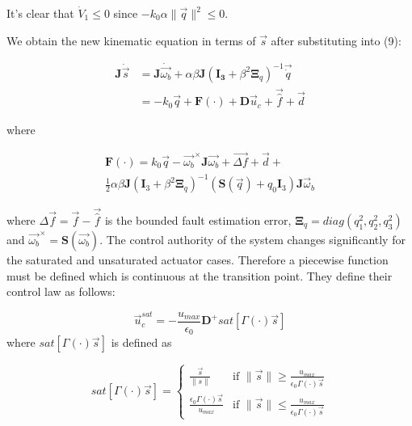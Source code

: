 It's clear that $\dot{V}_{1}\leq0$ since $-k_{0}\alpha \lVert \vec{q} \rVert^{2}\leq0$.


We obtain the new kinematic equation in terms of $\vec{s}$ after substituting into (9):

\begin{equation}
    \begin{split}
        \mathbf{J}\dot{\vec{s}}&=
        \mathbf{J}\dot{\vec{\omega_b}} + \alpha\beta\mathbf{J}(\mathbf{I_3}+\beta^2\mathbf{\Xi}_q)^{-1}\vec{\dot{q}}\\
        &=-k_0\vec{q}+\mathbf{F}(\cdot)+\mathbf{D}\vec{u}_{c}+\vec{\hat{f}}+\vec{d}
    \end{split}
\end{equation}

where

\begin{multline}
    \mathbf{F}(\cdot)=k_0\vec{q}-\vec{\omega_b}^{\times}\mathbf{J}\vec{\omega_b}+\vec{\Delta f} + \vec{d} + \\
    \frac{1}{2}\alpha\beta\mathbf{J}(\mathbf{I}_3+\beta^2\mathbf{\Xi}_q)^{-1}(\mathbf{S}(\vec{q})+q_0\mathbf{I}_3)\mathbf{J}\vec{\omega}_{b}
\end{multline}

where $\Delta \vec{f}=\vec{f}-\vec{\hat{f}}$ is the bounded fault estimation error,
$\mathbf{\Xi}_q=diag(q_1^2,q_2^2,q_3^2)$ and
$\vec{\omega_b}^{\times}=\mathbf{S}(\vec{\omega_b})$. 
The control authority of the system changes significantly for the saturated and unsaturated actuator cases. Therefore a piecewise function must be defined which is continuous at the transition point. They define their control law as follows:

\begin{equation}
\vec{u}^{sat}_{c} = -\frac{u_{max}}{\epsilon_{0}}\mathbf{D}^+ sat[\Gamma(\cdot)\vec{s}]
\end{equation}
where $sat[\Gamma(\cdot)\vec{s}]$ is defined as

\begin{equation}
    sat[\Gamma(\cdot)\vec{s}]=\begin{cases}
        \frac{\vec{s}}{\lVert s \rVert} & \text{if } \lVert \vec{s} \rVert \geq \frac{u_{max}}{\epsilon_0\Gamma(\cdot)\vec{s}}\\
        \frac{\epsilon_0\Gamma(\cdot)\vec{s}}{u_{max}} & \text{if } \lVert \vec{s} \rVert \leq \frac{u_{max}}{\epsilon_0\Gamma(\cdot)\vec{s}}
    \end{cases}
\end{equation}

